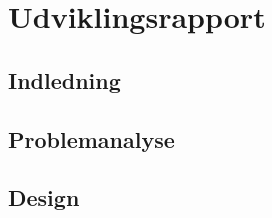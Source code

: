 


\frontmatter %


\cleardoublepage %


\cleardoublepage

\cleardoublepage

\cleardoublepage



\setlength\parskip{0ex} %
\tableofcontents* %
\setlength{\parskip}{3mm} %



\label{marker}
\mainmatter

\pagestyle{custom}

\part{Udviklingsrapport}
\chapter{Indledning} 


\chapter{Problemanalyse}
\label{chap:problem}







\chapter{Design}
\label{chap:design}



